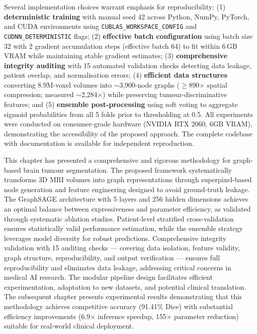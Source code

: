 Several implementation choices warrant emphasis for reproducibility: (1) \textbf{deterministic training} with manual seed 42 across Python, NumPy, PyTorch, and CUDA environments using \texttt{CUBLAS\_WORKSPACE\_CONFIG} and \texttt{CUDNN\_DETERMINISTIC} flags; (2) \textbf{effective batch configuration} using batch size 32 with 2 gradient accumulation steps (effective batch 64) to fit within 6\,GB VRAM while maintaining stable gradient estimates; (3) \textbf{comprehensive integrity auditing} with 15 automated validation checks detecting data leakage, patient overlap, and normalisation errors; (4) \textbf{efficient data structures} converting 8.9M-voxel volumes into $\sim$3,900-node graphs ($\geq$890$\times$ spatial compression; measured $\sim$2,284$\times$) while preserving tumour-discriminative features; and (5) \textbf{ensemble post-processing} using soft voting to aggregate sigmoid probabilities from all 5 folds prior to thresholding at 0.5. All experiments were conducted on consumer-grade hardware (NVIDIA RTX 2060, 6GB VRAM), demonstrating the accessibility of the proposed approach. The complete codebase with documentation is available for independent reproduction.

\vspace{5mm}

This chapter has presented a comprehensive and rigorous methodology for graph-based brain tumour segmentation. The proposed framework systematically transforms 3D MRI volumes into graph representations through superpixel-based node generation and feature engineering designed to avoid ground-truth leakage. The GraphSAGE architecture with 5 layers and 256 hidden dimensions achieves an optimal balance between expressiveness and parameter efficiency, as validated through systematic ablation studies. Patient-level stratified cross-validation ensures statistically valid performance estimation, while the ensemble strategy leverages model diversity for robust predictions. Comprehensive integrity validation with 15 auditing checks — covering data isolation, feature validity, graph structure, reproducibility, and output verification — ensures full reproducibility and eliminates data leakage, addressing critical concerns in medical AI research. The modular pipeline design facilitates efficient experimentation, adaptation to new datasets, and potential clinical translation. The subsequent chapter presents experimental results demonstrating that this methodology achieves competitive accuracy (91.41\% Dice) with substantial efficiency improvements (6.9$\times$ inference speedup, 155$\times$ parameter reduction) suitable for real-world clinical deployment.

\clearpage

